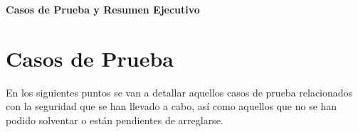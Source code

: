 \newpage{\pagestyle{empty}\cleardoublepage}
\newpage
\vspace*{\fill}
    \begin{center}
      \thispagestyle{empty} \vspace*{0cm} \textbf{\huge
Casos de Prueba y Resumen Ejecutivo}
    \end{center}
    \vspace*{\fill}
\newpage{\pagestyle{empty}\cleardoublepage}

\chapter{Casos de Prueba}

En los siguientes puntos se van a detallar aquellos casos de prueba relacionados con la seguridad que se han llevado a cabo, as\'{i} como aquellos que no se han podido solventar o est\'{a}n pendientes de arreglarse.

